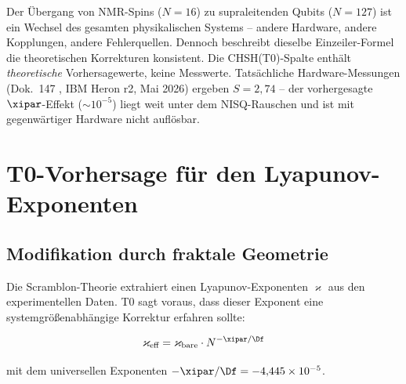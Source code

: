 \begin{keyresult}
	Der Übergang von NMR-Spins ($N=16$) zu supraleitenden Qubits ($N=127$) ist ein Wechsel des gesamten physikalischen Systems -- andere Hardware, andere Kopplungen, andere Fehlerquellen. Dennoch beschreibt dieselbe Einzeiler-Formel die theoretischen Korrekturen konsistent. Die CHSH(T0)-Spalte enthält \emph{theoretische} Vorhersagewerte, keine Messwerte. Tatsächliche Hardware-Messungen (Dok.~147 \cite{pascher_quantum_computing_2025}, IBM Heron r2, Mai 2026) ergeben $S = 2{,}74$ -- der vorhergesagte $\xipar$-Effekt ($\sim 10^{-5}$) liegt weit unter dem NISQ-Rauschen und ist mit gegenwärtiger Hardware nicht auflösbar.
\end{keyresult}

\section{T0-Vorhersage für den Lyapunov-Exponenten}
\label{sec:lyapunov}

\subsection{Modifikation durch fraktale Geometrie}

Die Scramblon-Theorie extrahiert einen Lyapunov-Exponenten $\varkappa$ aus den experimentellen Daten. T0 sagt voraus, dass dieser Exponent eine systemgrößenabhängige Korrektur erfahren sollte:

\begin{equation}
	\varkappa_{\text{eff}} = \varkappa_{\text{bare}} \cdot N^{-\xipar/\Df}
	\label{eq:lyapunov_correction}
\end{equation}

mit dem universellen Exponenten $-\xipar/\Df = -4{,}445 \times 10^{-5}$.

\begin{table}[h]
	\centering
	\caption{Vorhergesagte T0-Korrektur des Lyapunov-Exponenten}
	\label{tab:lyapunov}
\end{table}

